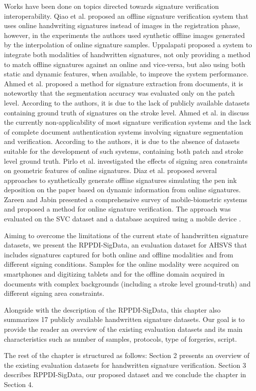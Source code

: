 Works have been done on topics directed towards signature verification interoperability. Qiao et al. \cite{qiao2007offline} proposed an offline signature verification system that uses online handwriting signatures instead of images in the registration phase, however, in the experiments the authors used synthetic offline images generated by the interpolation of online signature samples. Uppalapati \cite{uppalapati2007integration} proposed a system to integrate both modalities of handwritten signatures, not only providing a method to match offline signatures against an online and vice-versa, but also using both static and dynamic features, when available, to improve the system performance. Ahmed et al. \cite{liwicki-sigseg} proposed a method for signature extraction from documents, it is noteworthy that the segmentation accuracy was evaluated only on the patch level. According to the authors, it is due to the lack of publicly available datasets containing ground truth of signatures on the stroke level. Ahmed et al. in \cite{towards2013} discuss the currently non-applicability of most signature verification systems and the lack of complete document authentication systems involving signature segmentation and verification. According to the authors,  it is due to the absence of datasets suitable for the development of such systems, containing both patch and stroke level ground truth. Pirlo et al. \cite{pirlo2015interoperability} investigated the effects of signing area constraints on geometric features of online signatures. Diaz et al. \cite{diaz2014generation} proposed several approaches to synthetically generate offline signatures simulating the pen ink deposition on the paper based on dynamic information from online signatures. Zareen and Jabin \cite{zareen2016mobile} presented a comprehensive survey of mobile-biometric systems and proposed a method for online signature verification. The approach was evaluated on the SVC \cite{svc2004} dataset and a database acquired using a mobile device \cite{sgnote}.

Aiming to overcome the limitations of the current state of handwritten signature datasets, we present the RPPDI-SigData, an evaluation dataset for AHSVS that includes signatures captured for both online and offline modalities and from different signing conditions. Samples for the online modality were acquired on smartphones and digitizing tablets and for the offline domain acquired in documents with complex backgrounds (including a stroke level ground-truth) and different signing area constraints.

Alongside with the description of the RPPDI-SigData, this chapter also summarizes 17 publicly available handwritten signature datasets. Our goal is to provide the reader an overview of the existing evaluation datasets and its main characteristics such as number of samples, protocols, type of forgeries, script.

The rest of the chapter is structured as follows: Section 2 presents an overview of
the existing evaluation datasets for handwritten signature verification. Section 3 describes
RPPDI-SigData, our proposed dataset and we conclude the chapter in Section 4.

